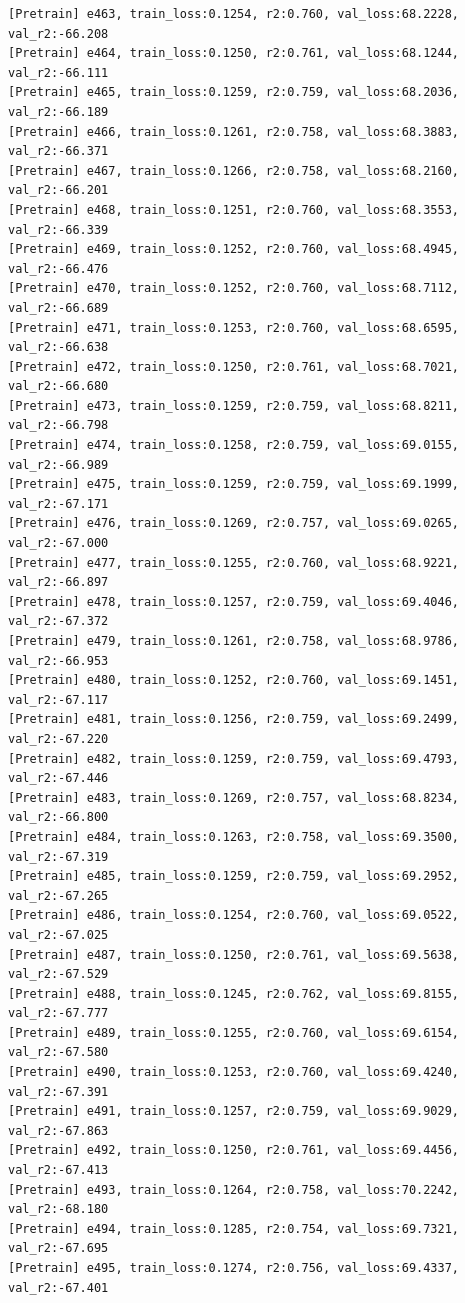 \documentclass[a4paper, 12pt]{article}
\begin{document}
\begin{lstlisting}
[Pretrain] e463, train_loss:0.1254, r2:0.760, val_loss:68.2228, val_r2:-66.208
[Pretrain] e464, train_loss:0.1250, r2:0.761, val_loss:68.1244, val_r2:-66.111
[Pretrain] e465, train_loss:0.1259, r2:0.759, val_loss:68.2036, val_r2:-66.189
[Pretrain] e466, train_loss:0.1261, r2:0.758, val_loss:68.3883, val_r2:-66.371
[Pretrain] e467, train_loss:0.1266, r2:0.758, val_loss:68.2160, val_r2:-66.201
[Pretrain] e468, train_loss:0.1251, r2:0.760, val_loss:68.3553, val_r2:-66.339
[Pretrain] e469, train_loss:0.1252, r2:0.760, val_loss:68.4945, val_r2:-66.476
[Pretrain] e470, train_loss:0.1252, r2:0.760, val_loss:68.7112, val_r2:-66.689
[Pretrain] e471, train_loss:0.1253, r2:0.760, val_loss:68.6595, val_r2:-66.638
[Pretrain] e472, train_loss:0.1250, r2:0.761, val_loss:68.7021, val_r2:-66.680
[Pretrain] e473, train_loss:0.1259, r2:0.759, val_loss:68.8211, val_r2:-66.798
[Pretrain] e474, train_loss:0.1258, r2:0.759, val_loss:69.0155, val_r2:-66.989
[Pretrain] e475, train_loss:0.1259, r2:0.759, val_loss:69.1999, val_r2:-67.171
[Pretrain] e476, train_loss:0.1269, r2:0.757, val_loss:69.0265, val_r2:-67.000
[Pretrain] e477, train_loss:0.1255, r2:0.760, val_loss:68.9221, val_r2:-66.897
[Pretrain] e478, train_loss:0.1257, r2:0.759, val_loss:69.4046, val_r2:-67.372
[Pretrain] e479, train_loss:0.1261, r2:0.758, val_loss:68.9786, val_r2:-66.953
[Pretrain] e480, train_loss:0.1252, r2:0.760, val_loss:69.1451, val_r2:-67.117
[Pretrain] e481, train_loss:0.1256, r2:0.759, val_loss:69.2499, val_r2:-67.220
[Pretrain] e482, train_loss:0.1259, r2:0.759, val_loss:69.4793, val_r2:-67.446
[Pretrain] e483, train_loss:0.1269, r2:0.757, val_loss:68.8234, val_r2:-66.800
[Pretrain] e484, train_loss:0.1263, r2:0.758, val_loss:69.3500, val_r2:-67.319
[Pretrain] e485, train_loss:0.1259, r2:0.759, val_loss:69.2952, val_r2:-67.265
[Pretrain] e486, train_loss:0.1254, r2:0.760, val_loss:69.0522, val_r2:-67.025
[Pretrain] e487, train_loss:0.1250, r2:0.761, val_loss:69.5638, val_r2:-67.529
[Pretrain] e488, train_loss:0.1245, r2:0.762, val_loss:69.8155, val_r2:-67.777
[Pretrain] e489, train_loss:0.1255, r2:0.760, val_loss:69.6154, val_r2:-67.580
[Pretrain] e490, train_loss:0.1253, r2:0.760, val_loss:69.4240, val_r2:-67.391
[Pretrain] e491, train_loss:0.1257, r2:0.759, val_loss:69.9029, val_r2:-67.863
[Pretrain] e492, train_loss:0.1250, r2:0.761, val_loss:69.4456, val_r2:-67.413
[Pretrain] e493, train_loss:0.1264, r2:0.758, val_loss:70.2242, val_r2:-68.180
[Pretrain] e494, train_loss:0.1285, r2:0.754, val_loss:69.7321, val_r2:-67.695
[Pretrain] e495, train_loss:0.1274, r2:0.756, val_loss:69.4337, val_r2:-67.401

\end{lstlisting}
\end{document}
